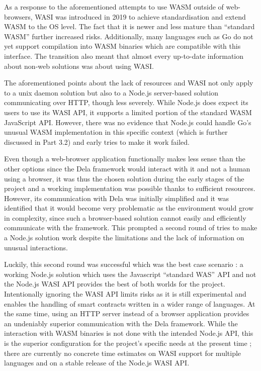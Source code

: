 \documentclass[11pt, a4paper, twoside, openright]{article}
\begin{document}
As a response to the aforementioned attempts to use WASM outside of web-browsers, WASI was introduced in 2019 to achieve standardisation and extend WASM to the OS level. The fact that it is newer and less mature than ``standard WASM'' further increased risks. Additionally, many languages such as Go do not yet support compilation into WASM binaries which are compatible with this interface. The transition also meant that almost every up-to-date information about non-web solutions was about using WASI.

The aforementioned points about the lack of resources and WASI not only apply to a unix daemon solution but also to a Node.js server-based solution communicating over HTTP, though less severely. While Node.js does expect its users to use its WASI API, it supports a limited portion of the standard WASM JavaScript API. However, there was no evidence that Node.js could handle Go's unusual WASM implementation in this specific context (which is further discussed in Part 3.2) and early tries to make it work failed.

Even though a web-browser application functionally makes less sense than the other options since the Dela framework would interact with it and not a human using a browser, it was thus the chosen solution during the early stages of the project and a working implementation was possible thanks to sufficient resources. However, its communication with Dela was initially simplified and it was identified that it would become very problematic as the environment would grow in complexity, since such a browser-based solution cannot easily and efficiently communicate with the framework. This prompted a second round of tries to make a Node.js solution work despite the limitations and the lack of information on unusual interactions.

Luckily, this second round was successful which was the best case scenario : a working Node.js solution which uses the Javascript ``standard WAS'' API and not the Node.js WASI API provides the best of both worlds for the project. Intentionally ignoring the WASI API limits risks as it is still experimental and enables the handling of smart contracts written in a wider range of languages. At the same time, using an HTTP server instead of a browser application provides an undeniably superior communication with the Dela framework. While the interaction with WASM binaries is not done with the intended Node.js API, this is the superior configuration for the project's specific needs at the present time ; there are currently no concrete time estimates on WASI support for multiple languages and on a stable release of the Node.js WASI API.
\end{document}
